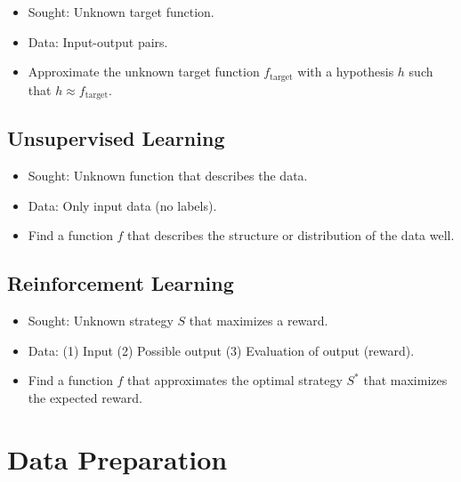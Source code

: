 \begin{itemize}

	\item Sought: Unknown target function.

	\item Data: Input-output pairs.

	\item Approximate the unknown target function \( f_{\text{target}} \) with a hypothesis \( h \) such that \( h \approx f_{\text{target}} \).

\end{itemize}

\subsection{Unsupervised Learning}

\begin{itemize}

	\item Sought: Unknown function that describes the data.

	\item Data: Only input data (no labels).

	\item Find a function \( f \) that describes the structure or distribution of the data well.

\end{itemize}

\subsection{Reinforcement Learning}

\begin{itemize}

	\item Sought: Unknown strategy \( S \) that maximizes a reward.

	\item Data: (1) Input  (2) Possible output (3) Evaluation of output (reward).

	\item Find a function \( f \) that approximates the optimal strategy \( S^* \) that maximizes the expected reward.

\end{itemize}

\section{Data Preparation}

